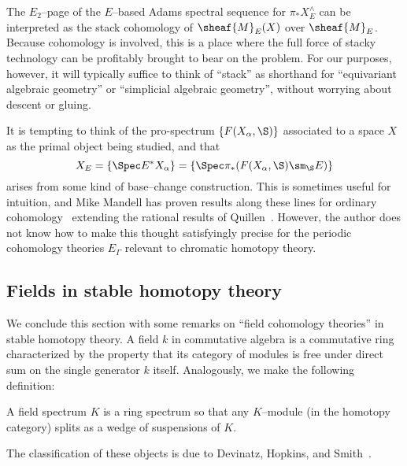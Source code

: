 \begin{remark}\label{AdamsSSeqAndStackCoh}
The $E_2$--page of the $E$--based Adams spectral sequence for $\pi_* X^\wedge_E$ can be interpreted as the stack cohomology of $\sheaf{M}_E(X)$ over $\sheaf{M}_E$.  Because cohomology is involved, this is a place where the full force of stacky technology can be profitably brought to bear on the problem.  For our purposes, however, it will typically suffice to think of ``stack'' as shorthand for ``equivariant algebraic geometry'' or ``simplicial algebraic geometry'', without worrying about descent or gluing.
\end{remark}

\begin{remark}\label{DeeperBaseRemark}
It is tempting to think of the pro-spectrum $\{F(X_\alpha, \S)\}$ associated to a space $X$ as the primal object being studied, and that \[X_E = \{\Spec E^* X_\alpha\} = \{\Spec \pi_* (F(X_\alpha, \S) \sm_{\S} E)\}\] arises from some kind of base--change construction.  This is sometimes useful for intuition, and Mike Mandell has proven results along these lines for ordinary cohomology~\cite{MandellHZCochains,MandellHFpCochains} extending the rational results of Quillen~\cite{QuillenRational}.  However, the author does not know how to make this thought satisfyingly precise for the periodic cohomology theories $E_\Gamma$ relevant to chromatic homotopy theory.
\end{remark}



\subsection*{Fields in stable homotopy theory}

We conclude this section with some remarks on ``field cohomology theories'' in stable homotopy theory.  A field $k$ in commutative algebra is a commutative ring characterized by the property that its category of modules is free under direct sum on the single generator $k$ itself.  Analogously, we make the following definition:

\begin{definition}
A field spectrum $K$ is a ring spectrum so that any $K$--module (in the homotopy category) splits as a wedge of suspensions of $K$.
\end{definition}

The classification of these objects is due to Devinatz, Hopkins, and Smith~\cite{HopkinsSmith}.

